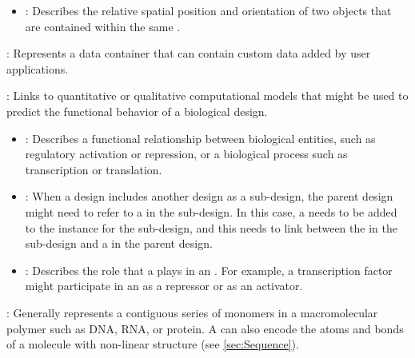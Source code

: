 \begin{description}
\begin{itemize}
\item \emph{}:
Describes the relative spatial position and orientation of two  objects that are contained within the same .
\end{itemize}

\item \emph{}:
Represents a data container that can contain custom data added by user applications.

\item \emph{}:
Links to quantitative or qualitative computational models that might be used to predict the functional behavior of a biological design.

\begin{itemize}

\item \emph{}:
Describes a functional relationship between biological entities, such as regulatory activation or repression, or a biological process such as transcription or translation.

\item \emph{}:
When a design  includes another design as a sub-design, the parent design might need to refer to a  in the sub-design.
In this case, a  needs to be added to the instance for the sub-design, and this  needs to link between the  in the sub-design and a  in the parent design.

\item \emph{}:
Describes the role that a  plays in an .
For example, a transcription factor might participate in an  as a repressor or as an activator.

\end{itemize}

\item \emph{}:
Generally represents a contiguous series of monomers in a macromolecular polymer such as DNA, RNA, or protein. A  can also encode the atoms and bonds of a molecule with non-linear structure (see \ref{sec:Sequence}).

\end{description}
